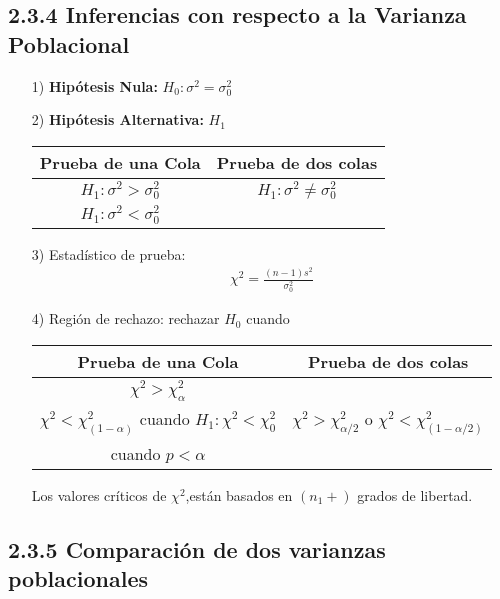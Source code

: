 \begin{frame}
\begin{frame}
\subsection{2.3.4 Inferencias con respecto a la Varianza Poblacional}




\begin{itemize}
\item[1) ] \textbf{Hip\'otesis Nula:} $H_{0}:\sigma^{2}=\sigma^{2}_{0}$
\item[2) ] \textbf{Hip\'otesis Alternativa: } $H_{1}$
\begin{tabular}{cc}\hline
\textbf{Prueba de una Cola} & \textbf{Prueba de dos colas}\\\hline
$H_{1}:\sigma^{2}>\sigma^{2}_{0}$ & $H_{1}:\sigma^{2}\neq \sigma^{2}_{0}$\\ 
$H_{1}:\sigma^{2}<\sigma^{2}_{0}$&\\
\end{tabular}
\item[3) ] Estad\'istico de prueba:
\begin{eqnarray*}
\chi^{2}=\frac{\left(n-1\right)s^{2}}{\sigma^{2}_{0}}
\end{eqnarray*}

\end{itemize}







\begin{itemize}
\item[4) ] Regi\'on de rechazo: rechazar $H_{0}$ cuando
\begin{tabular}{cc}\hline
\textbf{Prueba de una Cola} & \textbf{Prueba de dos colas}\\\hline
$\chi^{2}>\chi^{2}_{\alpha}$ & \\
$\chi^{2}<\chi^{2}_{\left(1-\alpha\right)}$ cuando $H_{1}:\chi^{2}<\chi^{2}_{0}$&$\chi^{2}>\chi^{2}_{\alpha/2}$ o $\chi^{2}<\chi^{2}_{\left(1-\alpha/2\right)}$\\
 cuando $p<\alpha$&\\
\end{tabular}

Los valores cr\'iticos de $\chi^{2}$,est\'an basados en $\left(n_{1}+\right)$ grados de libertad.

\end{itemize}




\subsection{2.3.5 Comparaci\'on de dos varianzas poblacionales}





\end{frame}
\end{frame}
